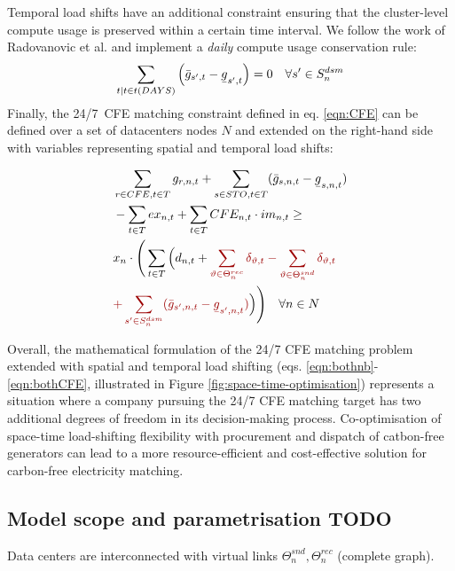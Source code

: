 Temporal load shifts have an additional constraint ensuring that the cluster-level compute usage is preserved within a certain time interval. We follow the work of Radovanovic et al. \cite{radovanovicIEEE2023} and implement a \textit{daily} compute usage conservation rule:
\begin{equation}
    \sum_{t | t \in t(DAYS)} \left(\bar{g}_{s',t} - \ubar{g}_{s',t}\right) = 0 \quad \forall {s'} \in S_n^{dsm}
    \label{eqn:dailyconserv2}
\end{equation}
Finally, the 24/7~CFE matching constraint defined in eq. \ref{eqn:CFE} can be defined over a set of datacenters nodes $N$ and extended on the right-hand side with variables representing spatial and temporal load shifts:

\begin{align}
    &\sum_{r\in CFE, t\in T} g_{r,n,t} + \sum_{s\in STO, t\in T} (\bar{g}_{s,n,t} - \ubar{g}_{s,n,t}) \nonumber \\
    &- \sum_{t\in T} ex_{n,t} + \sum_{t\in T} CFE_{n,t} \cdot im_{n,t} \geq \nonumber \\
    &x_n \cdot
        \Bigg( \sum_{t\in T} \Big( d_{n,t} + \textcolor{darkred}{\sum_{\vartheta \in \Theta_n^{rec}}\delta_{\vartheta, t} - \sum_{\vartheta \in \Theta_n^{snd}}\delta_{\vartheta, t}} \nonumber \\
        & \textcolor{darkred}{+ \sum_{{s'} \in S_n^{dsm}} (\bar{g}_{s',n,t} - \ubar{g}_{s',n,t})}\Big)\Bigg) \quad \forall n \in N\label{eqn:bothCFE}
\end{align}

Overall, the mathematical formulation of the 24/7 CFE matching problem extended with spatial and temporal load shifting (eqs. \ref{eqn:bothnb}-\ref{eqn:bothCFE}, illustrated in Figure \ref{fig:space-time-optimisation}) represents a situation where a company pursuing the 24/7 CFE matching target has two additional degrees of freedom in its decision-making process. Co-optimisation of space-time load-shifting flexibility with procurement and dispatch of catbon-free generators can lead to a more resource-efficient and cost-effective solution for carbon-free electricity matching.

\subsection{Model scope and parametrisation {\color{red} TODO}}

Data centers are interconnected with virtual links $\Theta_n^{snd}, \Theta_n^{rec}$ (complete graph).

